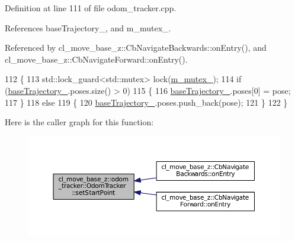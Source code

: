 Definition at line 111 of file odom\+\_\+tracker.\+cpp.



References base\+Trajectory\+\_\+, and m\+\_\+mutex\+\_\+.



Referenced by cl\+\_\+move\+\_\+base\+\_\+z\+::\+Cb\+Navigate\+Backwards\+::on\+Entry(), and cl\+\_\+move\+\_\+base\+\_\+z\+::\+Cb\+Navigate\+Forward\+::on\+Entry().


\begin{DoxyCode}
112 \{
113     std::lock\_guard<std::mutex> lock(\hyperlink{classcl__move__base__z_1_1odom__tracker_1_1OdomTracker_aa371639e1eee269273dec8d3ab9dba0f}{m\_mutex\_});
114     \textcolor{keywordflow}{if} (\hyperlink{classcl__move__base__z_1_1odom__tracker_1_1OdomTracker_a466d18a86df049f0f680e043bb5ea91f}{baseTrajectory\_}.poses.size() > 0)
115     \{
116         \hyperlink{classcl__move__base__z_1_1odom__tracker_1_1OdomTracker_a466d18a86df049f0f680e043bb5ea91f}{baseTrajectory\_}.poses[0] = pose;
117     \}
118     \textcolor{keywordflow}{else}
119     \{
120         \hyperlink{classcl__move__base__z_1_1odom__tracker_1_1OdomTracker_a466d18a86df049f0f680e043bb5ea91f}{baseTrajectory\_}.poses.push\_back(pose);
121     \}
122 \}
\end{DoxyCode}


Here is the caller graph for this function\+:
\nopagebreak
\begin{figure}[H]
\begin{center}
\leavevmode
\includegraphics[width=350pt]{classcl__move__base__z_1_1odom__tracker_1_1OdomTracker_a9f4989c6353022c2ec3b0546c09bf3bc_icgraph}
\end{center}
\end{figure}


